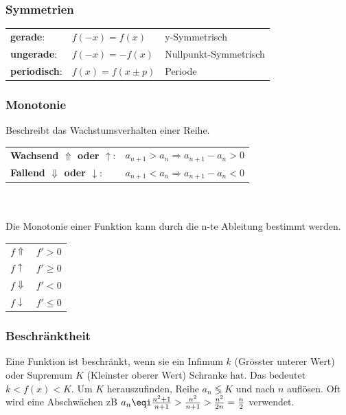 \subsubsection{Symmetrien}
\begin{tabular}{lll}
	\textbf{gerade}:& $f(-x) = f(x)$ & y-Symmetrisch\\
	\textbf{ungerade}:& $f(-x) = -f(x)$ & Nullpunkt-Symmetrisch\\
	\textbf{periodisch}:& $f(x) = f(x \pm p)$& Periode \\
\end{tabular}

\subsubsection{Monotonie}\label{monotonie}
Beschreibt das Wachstumsverhalten einer Reihe.\\
\noindent
\begin{tabular}{ll}
	\textbf{Wachsend $\Uparrow$ oder $\uparrow$}:& $a_{n+1} > a_n \Rightarrow a_{n+1} - a_n > 0$\\
	\textbf{Fallend $\Downarrow$ oder $\downarrow$}:& $a_{n+1} < a_n \Rightarrow a_{n+1} - a_n < 0$\\
\end{tabular}\\ \\

\noindent Die Monotonie einer Funktion kann durch die n-te Ableitung bestimmt werden.\\
\noindent\begin{tabular}{ll}
	$f \Uparrow$ & $f' > 0$\\
	$f \uparrow$ & $f' \geq 0$\\
	$f \Downarrow$ & $f' < 0$\\
	$f \downarrow$ & $f' \leq 0$\\
\end{tabular}

\subsubsection{Beschränktheit}\label{beschränkt}
Eine Funktion ist beschränkt, wenn sie ein Infimum $k$ (Grösster unterer Wert) oder Supremum $K$ (Kleinster oberer Wert) Schranke hat. Das bedeutet $k < f(x) < K$. Um $K$ herauszufinden, Reihe $a_n \lessgtr K$ und nach $n$ auflösen. Oft wird eine Abschwächen zB $a_n \eqi \frac{n^2+1}{n+1} > \frac{n^2}{n+1} > \frac{n^2}{2n} = \frac{n}{2}$ verwendet.

